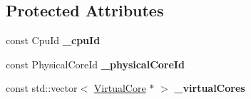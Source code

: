 \subsection*{Protected Attributes}
\begin{DoxyCompactItemize}
\item 
\hypertarget{classmammut_1_1topology_1_1PhysicalCore_a366e7d9045e2e0ce38c9a348856d41e6}{const Cpu\-Id {\bfseries \-\_\-cpu\-Id}}\label{classmammut_1_1topology_1_1PhysicalCore_a366e7d9045e2e0ce38c9a348856d41e6}

\item 
\hypertarget{classmammut_1_1topology_1_1PhysicalCore_ae1c83a9d2e61be31be246e9d0a2da0a0}{const Physical\-Core\-Id {\bfseries \-\_\-physical\-Core\-Id}}\label{classmammut_1_1topology_1_1PhysicalCore_ae1c83a9d2e61be31be246e9d0a2da0a0}

\item 
\hypertarget{classmammut_1_1topology_1_1PhysicalCore_a5d36d59b9bcc4e457a97d2797ce0c705}{const std\-::vector$<$ \hyperlink{classmammut_1_1topology_1_1VirtualCore}{Virtual\-Core} $\ast$ $>$ {\bfseries \-\_\-virtual\-Cores}}\label{classmammut_1_1topology_1_1PhysicalCore_a5d36d59b9bcc4e457a97d2797ce0c705}

\end{DoxyCompactItemize}


